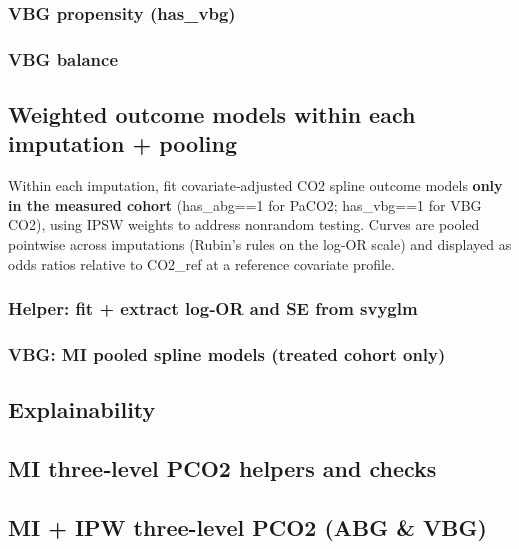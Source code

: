 \documentclass[
  11pt,
  letterpaper,
  DIV=11,
  numbers=noendperiod]{scrartcl}
\begin{document}
\subsubsection{VBG propensity (has\_vbg)}\label{vbg-propensity-has_vbg}

\subsubsection{VBG balance}\label{vbg-balance}

\subsection{Weighted outcome models within each imputation +
pooling}\label{weighted-outcome-models-within-each-imputation-pooling}

Within each imputation, fit covariate‑adjusted CO2 spline outcome models
\textbf{only in the measured cohort} (has\_abg==1 for PaCO2; has\_vbg==1
for VBG CO2), using IPSW weights to address nonrandom testing. Curves
are pooled pointwise across imputations (Rubin's rules on the log‑OR
scale) and displayed as odds ratios relative to CO2\_ref at a reference
covariate profile.

\subsubsection{Helper: fit + extract log‑OR and SE from
svyglm}\label{helper-fit-extract-logor-and-se-from-svyglm}

\subsubsection{VBG: MI pooled spline models (treated cohort
only)}\label{vbg-mi-pooled-spline-models-treated-cohort-only}

\subsection{Explainability}\label{explainability}

\subsection{MI three‑level PCO2 helpers and
checks}\label{mi-threelevel-pco2-helpers-and-checks}

\subsection{MI + IPW three-level PCO2 (ABG \&
VBG)}\label{mi-ipw-three-level-pco2-abg-vbg}
\end{document}
